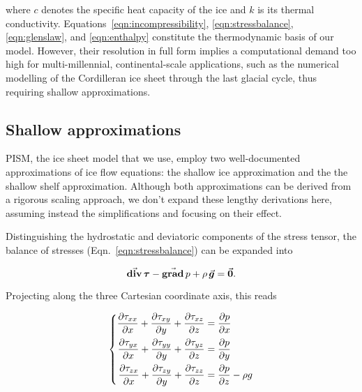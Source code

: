 \documentclass{article}
\newcommand{\vect}[1]{\va*{#1}} %
\newcommand{\tens}[1]{\vb*{#1}} %
\renewcommand{\grad}[1]{\vect{\mathrm{grad}}\,#1}   %
\newcommand{\tdiv}[1]{\vect{\mathrm{div}}\,#1}      %
\newcommand{\DST}[0]{\tens{\tau}}       %
\newcommand{\eqn}[1]{Eqn.~\ref{eqn:#1}}
\begin{document}
where $c$ denotes the specific heat capacity of the ice and $k$ is its thermal
conductivity. Equations~\ref{eqn:incompressibility}, \ref{eqn:stressbalance},
\ref{eqn:glenslaw}, and \ref{eqn:enthalpy} constitute the thermodynamic basis
of our model. However, their resolution in full form implies a computational
demand too high for multi-millennial, continental-scale applications, such as
the numerical modelling of the Cordilleran ice sheet through the last glacial
cycle, thus requiring shallow approximations.

\subsection{Shallow approximations}

PISM, the ice sheet model that we use, employ two well-documented
approximations of ice flow equations: the shallow ice approximation and the
the shallow shelf approximation. Although both approximations can be derived
from a rigorous scaling approach, we don't expand these lengthy derivations
here, assuming instead the simplifications and focusing on their effect.


Distinguishing the hydrostatic and deviatoric components of the stress tensor,
the balance of stresses (\eqn{stressbalance}) can be expanded into

\begin{equation}
    \label{eqn:stressbalance}
    \tdiv{\DST} - \grad{p} + \rho\,\vect{g} = \vect{0}.
\end{equation}

Projecting along the three Cartesian coordinate axis, this reads

\begin{equation}
    \label{eqn:fullstokes}
    \left\{\begin{aligned}
        \pdv{\tau_{xx}}{x} + \pdv{\tau_{xy}}{y} + \pdv{\tau_{xz}}{z}
            &= \pdv{p}{x} \\
        \pdv{\tau_{yx}}{x} + \pdv{\tau_{yy}}{y} + \pdv{\tau_{yz}}{z}
            &= \pdv{p}{y} \\
        \pdv{\tau_{zx}}{x} + \pdv{\tau_{zy}}{y} + \pdv{\tau_{zz}}{z}
            &= \pdv{p}{z} - \rho g
    \end{aligned}\right.
\end{equation}
\end{document}
